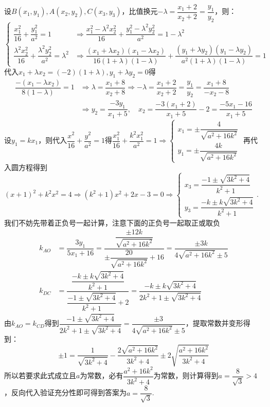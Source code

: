 \begin{solution}
    设$B(x_1,y_1),A(x_2,y_2),C(x_3,y_3)$，比值换元$-\lambda=\dfrac{x_1+2}{x_2+2}=\dfrac{y_1}{y_2}$，则：
    \[\begin{cases}\dfrac{x_1^2}{16}+\dfrac{y_1^2}{a^2}=1&\Rightarrow \dfrac{x_1^2-\lambda^2x_2^2}{16}+\dfrac{y_1^2-\lambda^2y_2^2}{a^2}=1-\lambda^2\\[1.2ex]\dfrac{\lambda^2x_2^2}{16}+\dfrac{\lambda^2y_2^2}{a^2}=\lambda^2&\Rightarrow \dfrac{(x_1+\lambda x_2)(x_1-\lambda x_2)}{16(1+\lambda)(1-\lambda)}+\dfrac{(y_1+\lambda y_2)(y_1-\lambda y_2)}{a^2(1+\lambda)(1-\lambda)}=1\end{cases}\]
    代入$x_1+\lambda x_2=(-2)(1+\lambda),y_1+\lambda y_2=0$得
    \begin{align*}\dfrac{-(x_1-\lambda x_2)}{8(1-\lambda)}=1&\Rightarrow \lambda=\dfrac{x_1+8}{x_2+8}\Rightarrow -\lambda=\dfrac{x_1+2}{x_2+2}=\dfrac{y_1}{y_2}=\dfrac{x_1+8}{-x_2-8}\\
    &\Rightarrow y_2=\dfrac{-3y_1}{x_1+5},\quad x_2=\dfrac{-3(x_1+2)}{x_1+5}-2=\dfrac{-5x_1-16}{x_1+5}
\end{align*}
设$y_1=kx_1$，则代入$\dfrac{x^2}{16}+\dfrac{y^2}{a^2}=1$得$\dfrac{x_1^2}{16}+\dfrac{k^2x_1^2}{a^2}=1\Rightarrow \begin{cases}x_1=\pm\dfrac{4}{\sqrt{a^2+16k^2}}\\[1.2ex]y_1=\pm\dfrac{4k}{\sqrt{a^2+16k^2}}\end{cases}$\newline
再代入圆方程得到$(x+1)^2+k^2x^2=4\Rightarrow (k^2+1)x^2+2x-3=0\Rightarrow \begin{cases}x_3=\dfrac{-1\pm\sqrt{3k^2+4}}{k^2+1}\\y_3=\dfrac{-k\pm k\sqrt{3k^2+4}}{k^2+1}\end{cases}$.\newline
我们不妨先带着正负号一起计算，注意下面的正负号一起取正或取负
\begin{align*}
    k_{AO}&=\dfrac{3y_1}{5x_1+16}=\dfrac{\dfrac{\pm 12k}{\sqrt{a^2+16k^2}}}{\pm\dfrac{20}{\sqrt{a^2+16k^2}}+16}=\dfrac{\pm 3k}{4\sqrt{a^2+16k^2}\pm 5}\\[1.2ex]
    k_{DC}&=\dfrac{\dfrac{-k\pm k\sqrt{3k^2+4}}{k^2+1}}{\dfrac{-1\pm\sqrt{3k^2+4}}{k^2+1}+2}=\dfrac{-k\pm k\sqrt{3k^2+4}}{2k^2+1\pm \sqrt{3k^2+4}}
\end{align*}
由$k_{AO}=k_{CD}$得到$\dfrac{-1\pm \sqrt{3k^2+4}}{2k^2+1\pm \sqrt{3k^2+4}}=\dfrac{\pm 3}{4\sqrt{a^2+16k^2}\pm 5}$，提取常数并变形得到：
\[\pm 1=\dfrac{1}{\sqrt{3k^2+4}}-\dfrac{2\sqrt{a^2+16k^2}}{3k^2+4}\pm 2\sqrt{\dfrac{a^2+16k^2}{3k^2+4}}\]
所以若要求此式成立且$a$为常数，必有$\dfrac{a^2+16k^2}{3k^2+4}$为常数，则计算得到$a=\dfrac{8}{\sqrt{3}}>4$，反向代入验证充分性即可得到答案为$a=\dfrac{8}{\sqrt{3}}$.
\end{solution}
